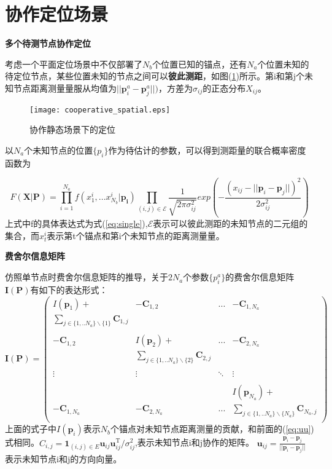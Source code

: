 \section[协作定位场景]{协作定位场景}\label{section:cooperative_localization}

\textbf{多个待测节点协作定位}

考虑一个平面定位场景中不仅部署了$N_b$个位置已知的锚点，还有$N_a$个位置未知的待定位节点，某些位置未知的节点之间可以\textbf{彼此测距}，如图(\ref{fig:cooperative_spatial})所示。第i和第j个未知节点距离测量量服从均值为$||\bm{p}^a_i-\bm{p}^a_j||)$，方差为$\sigma_{ij}$的正态分布$X_{ij}$。
        \begin{figure}
          \centering
          \texttt{[image: cooperative\_spatial.eps]}
          \caption{协作静态场景下的定位}\label{fig:cooperative_spatial}
        \end{figure}

以$N_a$个未知节点的位置$\{p_i\}$作为待估计的参数，可以得到测距量的联合概率密度函数为

\begin{equation}
F(\bm{X}|\bm{P})=\prod_{i=1}^{N_a} f(x^i_1,...x^{i}_{N_b}|\bm{p_i})\prod_{(i,j)\in \mathcal{E}}\frac{1}{\sqrt{2\pi\sigma_{ij}^2}}exp\left(-\frac{(x_{ij}-||\bm{p}_i-\bm{p}_j||)^2}{2\sigma_{ij}^2}\right)
\end{equation}
上式中f的具体表达式为式(\ref{eq:single}),$\mathcal{E}$表示可以彼此测距的未知节点的二元组的集合，而$x_t^i$表示第t个锚点和第i个未知节点的距离测量量。

\textbf{费舍尔信息矩阵}

仿照单节点时费舍尔信息矩阵的推导，关于$2N_a$个参数$\{p_i^a\}$的费舍尔信息矩阵$\bm{I}(\bm{P})$有如下的表达形式：
\begin{equation}\label{eq:general_fim}
\bm{I}(\bm{P})=
\left(
\begin{array}{cccc}
I(\bm{p}_1)+&-\bm{C}_{1,2}&...&-\bm{C}_{1,N_a}\\
\sum_{j\in \{1,..N_a\}\backslash\{1\}}\bm{C}_{1,j}&&&\\
&&&\\
-\bm{C}_{1,2} & I(\bm{p}_2)+
&...&-\bm{C}_{2,N_a}\\
&\sum_{j\in \{1,..N_a\}\backslash \{2\}}\bm{C}_{2,j}&&\\
&&&\\
\vdots &\vdots&\ddots &\vdots\\
&&&\\
&&&I(\bm{p}_{N_a})+\\
-\bm{C}_{1,N_a}&-\bm{C}_{2,N_a}&...& \sum_{j\in \{1,..N_a\}\backslash\{N_a\}}\bm{C}_{N_a,j}\\
\end{array}
\right)
\end{equation}
上面的式子中$I(\bm{p}_i)$表示$N_b$个锚点对未知节点距离测量的贡献，和前面的(\ref{eq:uu})式相同。$C_{i,j}=\bm{1}_{(i,j)\in E}\bm{u}_{ij}\bm{u}_{ij}^{\textrm{T}} /\sigma^2_{ij}$,表示未知节点i和j协作的矩阵。
$\bm{u}_{ij}=\frac{\bm{p}_i-\bm{p}_j}{||\bm{p}_i-\bm{p}_j||}$表示未知节点i和j的方向向量。
